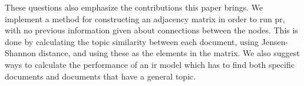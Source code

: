 These questions also emphasize the contributions this paper brings.
We implement a method for constructing an adjacency matrix in order to run \gls{pr}, with no previous information given about connections between the nodes.
This is done by calculating the topic similarity between each document, using Jensen-Shannon distance, and using these as the elements in the matrix.
We also suggest ways to calculate the performance of an \gls{ir} model which has to find both specific documents and documents that have a general topic.
